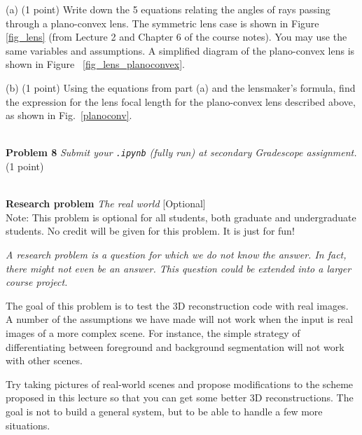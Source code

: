 \documentclass[11pt]{article}
\newcommand{\hwproblem}[2] {\noindent \\ {\bf #1} {\it #2}}
\begin{document}
(a) (1 point) Write down the 5 equations relating the angles of rays passing through a plano-convex lens. The symmetric lens case is shown in Figure \ref{fig_lens} (from Lecture 2 and Chapter 6 of the course notes). You may use the same variables and assumptions. A simplified diagram of the plano-convex lens is shown in Figure ~\ref{fig_lens_planoconvex}.

(b) (1 point) Using the equations from part (a) and the lensmaker's formula, find the expression for the lens focal length for the plano-convex lens described above, as shown in Fig.~\ref{planoconv}.

\hwproblem{Problem 8}{ Submit your \texttt{.ipynb} (fully run) at secondary Gradescope assignment.} (1 point)

\newpage
\hwproblem{Research problem} {The real world} [Optional]\\
Note: This problem is optional for all students, both graduate and undergraduate students. No credit will be given for this problem. It is just for fun!


\textit{A research problem is a question for which we do not know the answer. In fact, there might not
even be an answer. This question could be extended into a larger course project.}

The goal of this problem is to test the 3D reconstruction code with real images. A number of the assumptions we have made will not work when the input is real images of a more complex scene. For instance, the simple strategy of differentiating between foreground and background segmentation will not work with other scenes.

Try taking pictures of real-world scenes and propose modifications to the scheme proposed in this lecture so that you can get some better 3D reconstructions. The goal is not to build a general system, but to be able to handle a few more situations.
\end{document}
